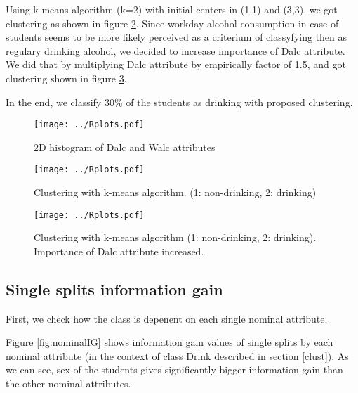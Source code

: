 \documentclass[a4paper]{article}
\begin{document}
\begin{multicols}{2}
Using k-means algorithm (k=2) with initial centers in (1,1) and (3,3), we got clustering as shown in figure \ref{fig:clust}.
Since workday alcohol consumption in case of students seems
to be more likely perceived as a criterium of classyfying then as
regulary drinking alcohol,
we decided to increase importance of Dalc attribute.
We did that by multiplying Dalc attribute by empirically factor of 1.5, and got clustering shown in figure \ref{fig:clust2}.

In the end, we classify 30\% of the students as drinking with proposed clustering.




\begin{figure}[H]
    \centering
    \texttt{[image: ../Rplots.pdf]}
    \label{fig:hist2D}
    \caption[]{2D histogram of Dalc and Walc attributes}
\end{figure}

\begin{figure}[H]
    \centering
    \texttt{[image: ../Rplots.pdf]}
    \label{fig:clust}
    \caption[]{Clustering with k-means algorithm. (1: non-drinking, 2: drinking)}
\end{figure}

\begin{figure}[H]
    \centering
    \texttt{[image: ../Rplots.pdf]}
    \label{fig:clust2}
    \caption[]{Clustering with k-means algorithm (1: non-drinking, 2: drinking). Importance of Dalc attribute increased.}
\end{figure}

\subsection{Single splits information gain}
\label{xent}
First, we check how the class is depenent on each single nominal attribute.

Figure \ref{fig:nominalIG} shows information gain values
of single splits by each nominal attribute (in the context of class Drink described in section \ref{clust}).
As we can see, sex of the students gives significantly bigger information gain
than the other nominal attributes.

% 


\end{multicols}
\end{document}
